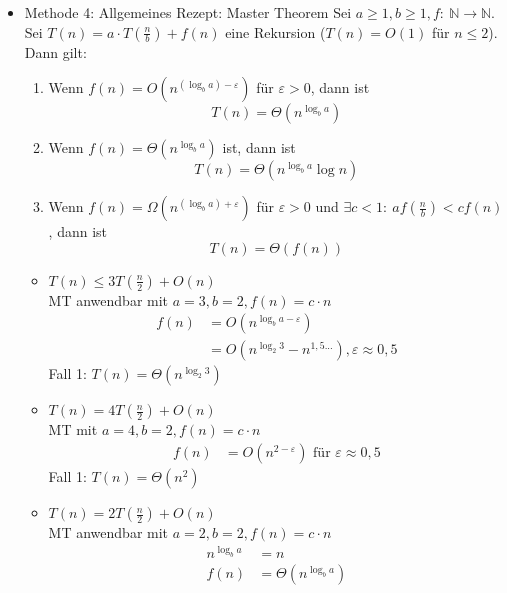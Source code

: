 \begin{itemize}
\begin{itemize}
        \end{itemize}
\item   Methode 4: Allgemeines Rezept: Master Theorem
        \Satz Sei $a \geq 1, b \geq 1, f{:}\ \mathbb{N} \to \mathbb{N}$. Sei $T(n) = a \cdot T\left(\frac{n}{b}\right) + f(n)$ eine Rekursion ($T(n) = O(1)$ für $n \leq 2$). Dann gilt:
        \begin{enumerate}
         \item Wenn $f(n) = O(n^{(\log_b a) - \varepsilon})$ für $\varepsilon > 0$, dann ist 
                \[T(n) = \Theta(n^{\log_b a})\]
         \item Wenn $f(n) = \Theta(n^{\log_b a})$ ist, dann ist
                \[T(n) = \Theta\left(n^{\log_b a} \log n\right)\]
         \item Wenn $f(n) = \Omega(n^{(\log_b a) + \varepsilon})$ für $\varepsilon > 0$ und $\exists c < 1{:}\ a f\left(\frac{n}{b}\right) < c f\left(n\right)$, dann ist
                \[T(n) = \Theta\left(f(n)\right)\]
        \end{enumerate}
        \Bsp    \begin{itemize}
        \item   $T(n) \leq 3 T\left(\frac{n}{2}\right) + O(n)$\\
                MT anwendbar mit $a = 3, b = 2, f(n) = c \cdot n$
                \begin{align*}
                 f(n)   &= O(n^{\log_b a - \varepsilon}) \\
                        &= O(n^{\log_2 3} - n^{1{,}5...}), \varepsilon \approx 0{,}5
                \end{align*}
                Fall 1: $T(n) = \Theta(n^{\log_2 3})$
        \item   $T(n) = 4 T\left(\frac{n}{2}\right) + O(n)$ \\
                MT mit $a = 4, b = 2, f(n) = c \cdot n$
                \begin{align*}
                 f(n) &= O(n^{2 - \varepsilon}) \text{ für $\varepsilon \approx 0{,}5$}
                \end{align*}
                Fall 1: $T(n) = \Theta(n^2)$
        \item   $T(n) = 2 T\left(\frac{n}{2}\right) + O(n)$ \\
                MT anwendbar mit $a = 2, b = 2, f(n) = c \cdot n$
                \begin{align*}
                 n^{\log_b a} &= n\\
                 f(n) &= \Theta(n^{\log_b a})

\end{align*}
\end{itemize}
\end{itemize}

